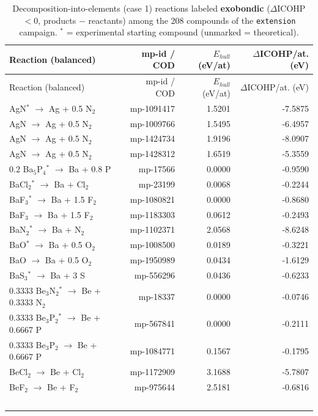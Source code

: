 \begin{longtable}{@{}lrrr@{}}
\caption{Decomposition-into-elements (case 1) reactions labeled \textbf{exobondic} ($\Delta$ICOHP $< 0$, products $-$ reactants) among the 208 compounds of the \texttt{extension} campaign. $^*$ = experimental starting compound (unmarked = theoretical).}\\
\toprule
Reaction (balanced) & mp-id / COD & $E_{hull}$ (eV/at) & $\Delta$ICOHP/at. (eV) \\
\midrule
\endfirsthead
\toprule
Reaction (balanced) & mp-id / COD & $E_{hull}$ (eV/at) & $\Delta$ICOHP/at. (eV) \\
\midrule
\endhead
\bottomrule
\endfoot
AgN$^*$ $\rightarrow$ Ag + 0.5 N$_{2}$ & mp-1091417 & 1.5201 & -7.5875 \\
AgN $\rightarrow$ Ag + 0.5 N$_{2}$ & mp-1009766 & 1.5495 & -6.4957 \\
AgN $\rightarrow$ Ag + 0.5 N$_{2}$ & mp-1424734 & 1.9196 & -8.0907 \\
AgN $\rightarrow$ Ag + 0.5 N$_{2}$ & mp-1428312 & 1.6519 & -5.3559 \\
0.2 Ba$_{5}$P$_{4}$$^*$ $\rightarrow$ Ba + 0.8 P & mp-17566 & 0.0000 & -0.9590 \\
BaCl$_{2}$$^*$ $\rightarrow$ Ba + Cl$_{2}$ & mp-23199 & 0.0068 & -0.2244 \\
BaF$_{3}$$^*$ $\rightarrow$ Ba + 1.5 F$_{2}$ & mp-1080821 & 0.0000 & -0.8680 \\
BaF$_{3}$ $\rightarrow$ Ba + 1.5 F$_{2}$ & mp-1183303 & 0.0612 & -0.2493 \\
BaN$_{2}$$^*$ $\rightarrow$ Ba + N$_{2}$ & mp-1102371 & 2.0568 & -8.6248 \\
BaO$^*$ $\rightarrow$ Ba + 0.5 O$_{2}$ & mp-1008500 & 0.0189 & -0.3221 \\
BaO $\rightarrow$ Ba + 0.5 O$_{2}$ & mp-1950989 & 0.0434 & -1.6129 \\
BaS$_{3}$$^*$ $\rightarrow$ Ba + 3 S & mp-556296 & 0.0436 & -0.6233 \\
0.3333 Be$_{3}$N$_{2}$$^*$ $\rightarrow$ Be + 0.3333 N$_{2}$ & mp-18337 & 0.0000 & -0.0746 \\
0.3333 Be$_{3}$P$_{2}$$^*$ $\rightarrow$ Be + 0.6667 P & mp-567841 & 0.0000 & -0.2111 \\
0.3333 Be$_{3}$P$_{2}$ $\rightarrow$ Be + 0.6667 P & mp-1084771 & 0.1567 & -0.1795 \\
BeCl$_{2}$ $\rightarrow$ Be + Cl$_{2}$ & mp-1172909 & 3.1688 & -5.7807 \\
BeF$_{2}$ $\rightarrow$ Be + F$_{2}$ & mp-975644 & 2.5181 & -0.6816 \\
$$
\end{longtable}
